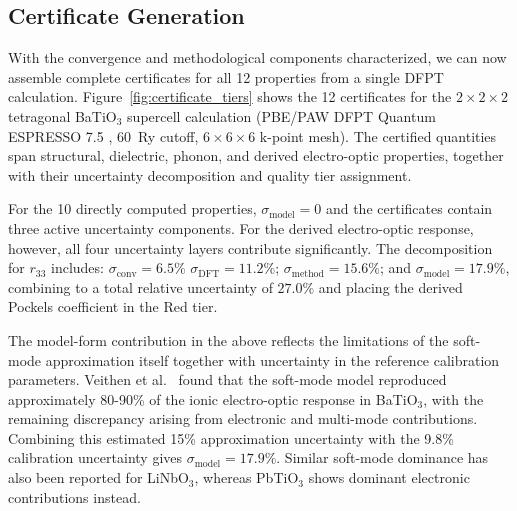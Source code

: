 \documentclass[prb,twocolumn,superscriptaddress,amsmath,amssymb,longbibliography]{revtex4-2}
\newcommand{\conv}{\mathrm{conv}}
\newcommand{\meth}{\mathrm{method}}
\begin{document}
\subsection{Certificate Generation}
\label{sec:cert_generation}

With the convergence and methodological components characterized, we can now 
assemble complete certificates for all 12 properties from a single DFPT
calculation. Figure~\ref{fig:certificate_tiers} shows the 12 
 certificates for the $2\times2\times2$ tetragonal BaTiO$_3$ supercell calculation (PBE/PAW DFPT  Quantum 
ESPRESSO 7.5 \cite{Giannozzi2009_QE}, 
60~Ry cutoff, $6\times6\times6$ k-point mesh). The certified quantities span structural, 
dielectric, phonon, and derived electro-optic properties, together with their 
uncertainty decomposition and quality tier assignment.


For the 10 directly computed properties, 
$\sigma_{\mathrm{model}} = 0$ and the certificates contain three active uncertainty
components. For the derived electro-optic response, however, all four uncertainty layers contribute significantly. The decomposition for $r_{33}$ includes: $\sigma_\conv = 6.5\%$ 
$\sigma_{\mathrm{DFT}} = 11.2\%$; 
$\sigma_\meth = 15.6\%$; 
and $\sigma_{\mathrm{model}} = 17.9\%$, combining to a total relative uncertainty of $27.0\%$ and placing the derived Pockels coefficient in the Red tier.

The model-form contribution in the above reflects the limitations of the soft-mode approximation itself together with uncertainty in the reference calibration parameters. Veithen et al.\ \cite{Veithen2005} found that the soft-mode model reproduced approximately 80-90\% of the ionic electro-optic response in BaTiO$_3$, with the remaining discrepancy arising from electronic and multi-mode contributions. Combining this estimated 15\% approximation uncertainty with the 9.8\% calibration uncertainty gives $\sigma_{\mathrm{model}} = 17.9\%$. 
Similar soft-mode dominance has also been reported for LiNbO$_3$\cite{Veithen2004_PRL}, whereas PbTiO$_3$ shows dominant electronic contributions instead. 
\end{document}
